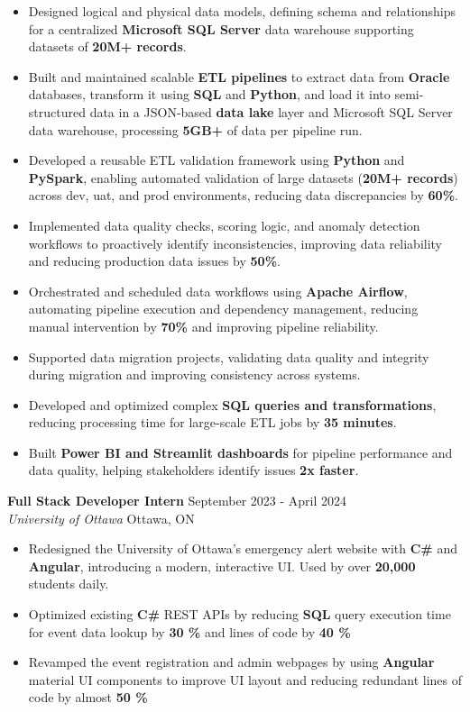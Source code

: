 \documentclass[a4paper]{article}
\begin{document}
\begin{itemize} \itemsep -2pt
\item Designed logical and physical data models, defining schema and relationships for a centralized \textbf{Microsoft SQL Server} data warehouse supporting datasets of \textbf{20M+ records}.
\item Built and maintained scalable \textbf{ETL pipelines} to extract data from \textbf{Oracle} databases, transform it using \textbf{SQL} and \textbf{Python}, and load it into semi-structured data in a JSON-based \textbf{data lake} layer and Microsoft SQL Server data warehouse, processing \textbf{5GB+} of data per pipeline run.
\item Developed a reusable ETL validation framework using \textbf{Python} and \textbf{PySpark}, enabling automated validation of large datasets (\textbf{20M+ records}) across dev, uat, and prod environments, reducing data discrepancies by \textbf{60\%}.
\item Implemented data quality checks, scoring logic, and anomaly detection workflows to proactively identify inconsistencies, improving data reliability and reducing production data issues by \textbf{50\%}.
\item Orchestrated and scheduled data workflows using \textbf{Apache Airflow}, automating pipeline execution and dependency management, reducing manual intervention by \textbf{70\%} and improving pipeline reliability.
\item Supported data migration projects, validating data quality and integrity during migration and improving consistency across systems.
\item Developed and optimized complex \textbf{SQL queries and transformations}, reducing processing time for large-scale ETL jobs by \textbf{35 minutes}.
\item Built \textbf{Power BI and Streamlit dashboards} for pipeline performance and data quality, helping stakeholders identify issues \textbf{2x faster}.
\end{itemize}
\textbf{Full Stack Developer Intern } \hfill September 2023 - April 2024\\
\textit{University of Ottawa} \hfill Ottawa, ON\\
\vspace{-2mm}
\begin{itemize} \itemsep -2pt
    \item Redesigned the University of Ottawa's emergency alert website with \textbf{C\#} and \textbf{Angular}, introducing a modern, interactive UI. Used by over \textbf{20,000} students daily.
     \item Optimized existing \textbf{C\#} REST APIs by reducing \textbf{SQL} query execution time for event data lookup by \textbf{30 \%} and lines of code by \textbf{40 \%}
    \item Revamped the event registration and admin webpages by using \textbf{Angular} material UI components to improve UI layout and reducing redundant lines of code by almost \textbf{50 \%}
\end{itemize}
\end{document}
